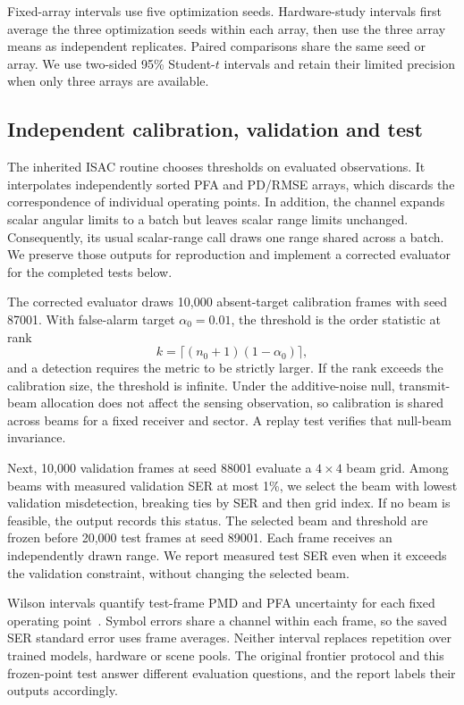 \documentclass[conference]{IEEEtran}
\begin{document}
Fixed-array intervals use five optimization seeds. Hardware-study intervals first average the three optimization seeds within each array, then use the three array means as independent replicates. Paired comparisons share the same seed or array. We use two-sided 95\% Student-$t$ intervals and retain their limited precision when only three arrays are available.

\subsection{Independent calibration, validation and test}
The inherited ISAC routine chooses thresholds on evaluated observations. It interpolates independently sorted PFA and PD/RMSE arrays, which discards the correspondence of individual operating points. In addition, the channel expands scalar angular limits to a batch but leaves scalar range limits unchanged. Consequently, its usual scalar-range call draws one range shared across a batch. We preserve those outputs for reproduction and implement a corrected evaluator for the completed tests below.

The corrected evaluator draws 10,000 absent-target calibration frames with seed 87001. With false-alarm target $\alpha_0=0.01$, the threshold is the order statistic at rank
\begin{equation}
 k=\lceil(n_0+1)(1-\alpha_0)\rceil,
\end{equation}
and a detection requires the metric to be strictly larger. If the rank exceeds the calibration size, the threshold is infinite. Under the additive-noise null, transmit-beam allocation does not affect the sensing observation, so calibration is shared across beams for a fixed receiver and sector. A replay test verifies that null-beam invariance.

Next, 10,000 validation frames at seed 88001 evaluate a $4\times4$ beam grid. Among beams with measured validation SER at most 1\%, we select the beam with lowest validation misdetection, breaking ties by SER and then grid index. If no beam is feasible, the output records this status. The selected beam and threshold are frozen before 20,000 test frames at seed 89001. Each frame receives an independently drawn range. We report measured test SER even when it exceeds the validation constraint, without changing the selected beam.

Wilson intervals quantify test-frame PMD and PFA uncertainty for each fixed operating point~\cite{wilson}. Symbol errors share a channel within each frame, so the saved SER standard error uses frame averages. Neither interval replaces repetition over trained models, hardware or scene pools. The original frontier protocol and this frozen-point test answer different evaluation questions, and the report labels their outputs accordingly.
\end{document}
